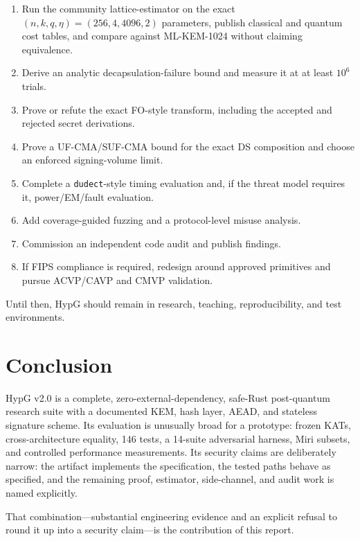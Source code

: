 \documentclass[runningheads]{llncs}
\begin{document}
\begin{enumerate}[leftmargin=*]
\item Run the community lattice-estimator on the exact
  $(n,k,q,\eta)=(256,4,4096,2)$ parameters, publish classical and
  quantum cost tables, and compare against ML-KEM-1024 without claiming
  equivalence.
\item Derive an analytic decapsulation-failure bound and measure it at
  at least $10^6$ trials.
\item Prove or refute the exact FO-style transform, including the
  accepted and rejected secret derivations.
\item Prove a UF-CMA/SUF-CMA bound for the exact DS composition and
  choose an enforced signing-volume limit.
\item Complete a \texttt{dudect}-style timing evaluation and, if the
  threat model requires it, power/EM/fault evaluation.
\item Add coverage-guided fuzzing and a protocol-level misuse analysis.
\item Commission an independent code audit and publish findings.
\item If FIPS compliance is required, redesign around approved
  primitives and pursue ACVP/CAVP and CMVP validation.
\end{enumerate}

Until then, HypG should remain in research, teaching, reproducibility,
and test environments.

\section{Conclusion}
\label{sec:conclusion}

HypG v2.0 is a complete, zero-external-dependency, safe-Rust
post-quantum research suite with a documented KEM, hash layer, AEAD, and
stateless signature scheme.  Its evaluation is unusually broad for a
prototype: frozen KATs, cross-architecture equality, 146 tests, a
14-suite adversarial harness, Miri subsets, and controlled performance
measurements.  Its security claims are deliberately narrow: the
artifact implements the specification, the tested paths behave as
specified, and the remaining proof, estimator, side-channel, and audit
work is named explicitly.

That combination---substantial engineering evidence and an explicit
refusal to round it up into a security claim---is the contribution of
this report.
\end{document}
